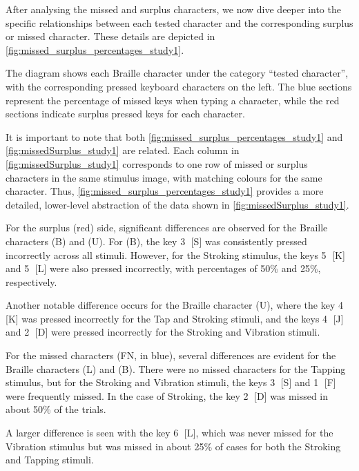 After analysing the missed and surplus characters, we now dive deeper into the specific relationships between each tested character and the corresponding surplus or missed character. These details are depicted in \autoref{fig:missed_surplus_percentages_study1}.

The diagram shows each Braille character under the category \enquote{tested character}, with the corresponding pressed keyboard characters on the left. 
The blue sections represent the percentage of missed keys when typing a character, while the red sections indicate surplus pressed keys for each character.

It is important to note that both \autoref{fig:missed_surplus_percentages_study1} and \autoref{fig:missedSurplus_study1} are related. Each column in \autoref{fig:missedSurplus_study1} corresponds to one row of missed or surplus characters in the same stimulus image, with matching colours for the same character. 
Thus, \autoref{fig:missed_surplus_percentages_study1} provides a more detailed, lower-level abstraction of the data shown in \autoref{fig:missedSurplus_study1}.

For the surplus (red) side, significant differences are observed for the Braille characters (B) and (U). For (B), the key \textcircled{3} [S] was consistently pressed incorrectly across all stimuli. However, for the Stroking stimulus, the keys \textcircled{5} [K] and \textcircled{5} [L] were also pressed incorrectly, with percentages of 50\% and 25\%, respectively.

Another notable difference occurs for the Braille character (U), where the key \textcircled{4} [K] was pressed incorrectly for the Tap and Stroking stimuli, and the keys \textcircled{4} [J] and \textcircled{2} [D] were pressed incorrectly for the Stroking and Vibration stimuli.

For the missed characters (FN, in blue), several differences are evident for the Braille characters (L) and (B). There were no missed characters for the Tapping stimulus, but for the Stroking and Vibration stimuli, the keys \textcircled{3} [S] and \textcircled{1} [F] were frequently missed. In the case of Stroking, the key \textcircled{2} [D] was missed in about 50\% of the trials.

A larger difference is seen with the key \textcircled{6} [L], which was never missed for the Vibration stimulus but was missed in about 25\% of cases for both the Stroking and Tapping stimuli.

